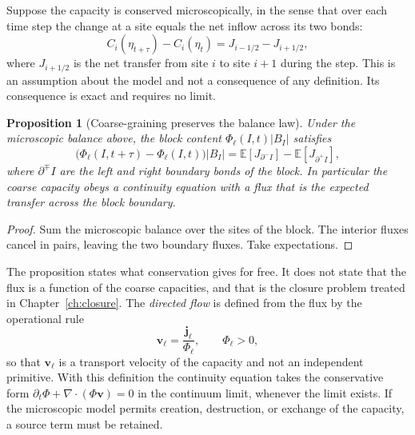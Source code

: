 \documentclass[11pt,oneside]{book}
\newtheorem{proposition}[theorem]{Proposition}
\theoremstyle{definition}
\theoremstyle{remark}
\begin{document}
Suppose the capacity is conserved microscopically, in the sense that over each time step the change at a site equals the net inflow across its two bonds:
\[
C_i(\eta_{t+\tau})-C_i(\eta_t)=J_{i-1/2}-J_{i+1/2},
\]
where $J_{i+1/2}$ is the net transfer from site $i$ to site $i+1$ during the step. This is an assumption about the model and not a consequence of any definition. Its consequence is exact and requires no limit.

\begin{proposition}[Coarse-graining preserves the balance law]\label{prop:balance}
Under the microscopic balance above, the block content $\Phi_\ell(I,t)|B_I|$ satisfies
\[
\bigl(\Phi_\ell(I,t+\tau)-\Phi_\ell(I,t)\bigr)|B_I|=\mathbb E[J_{\partial^-I}]-\mathbb E[J_{\partial^+I}],
\]
where $\partial^\mp I$ are the left and right boundary bonds of the block. In particular the coarse capacity obeys a continuity equation with a flux that is the expected transfer across the block boundary.
\end{proposition}

\begin{proof}
Sum the microscopic balance over the sites of the block. The interior fluxes cancel in pairs, leaving the two boundary fluxes. Take expectations.
\end{proof}

The proposition states what conservation gives for free. It does not state that the flux is a function of the coarse capacities, and that is the closure problem treated in Chapter~\ref{ch:closure}. The \emph{directed flow} is defined from the flux by the operational rule
\[
\mathbf v_\ell=\frac{\mathbf j_\ell}{\Phi_\ell},\qquad \Phi_\ell>0,
\]
so that $\mathbf v_\ell$ is a transport velocity of the capacity and not an independent primitive. With this definition the continuity equation takes the conservative form $\partial_t\Phi+\nabla\!\cdot(\Phi\mathbf v)=0$ in the continuum limit, whenever the limit exists. If the microscopic model permits creation, destruction, or exchange of the capacity, a source term must be retained.
\end{document}

